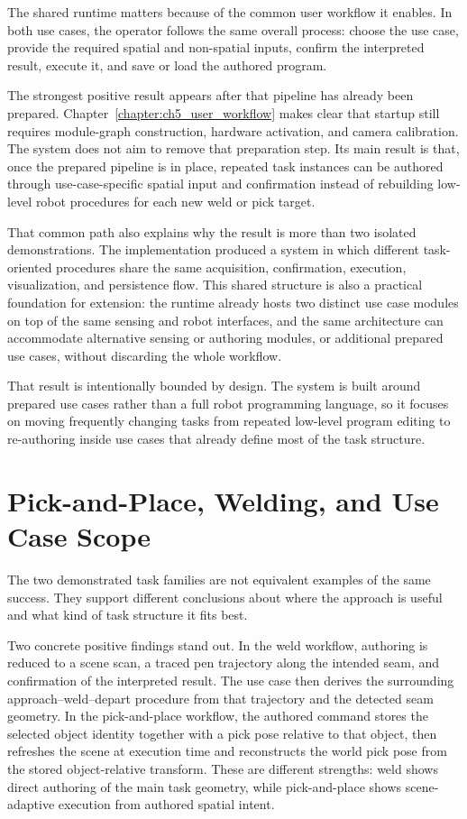The shared runtime matters because of the common user workflow it enables. In both use cases, the operator follows the same overall process: choose the use case, provide the required spatial and non-spatial inputs, confirm the interpreted result, execute it, and save or load the authored program.

The strongest positive result appears after that pipeline has already been prepared. Chapter~\ref{chapter:ch5_user_workflow} makes clear that startup still requires module-graph construction, hardware activation, and camera calibration. The system does not aim to remove that preparation step. Its main result is that, once the prepared pipeline is in place, repeated task instances can be authored through use-case-specific spatial input and confirmation instead of rebuilding low-level robot procedures for each new weld or pick target.

That common path also explains why the result is more than two isolated demonstrations. The implementation produced a system in which different task-oriented procedures share the same acquisition, confirmation, execution, visualization, and persistence flow. This shared structure is also a practical foundation for extension: the runtime already hosts two distinct use case modules on top of the same sensing and robot interfaces, and the same architecture can accommodate alternative sensing or authoring modules, or additional prepared use cases, without discarding the whole workflow.

That result is intentionally bounded by design. The system is built around prepared use cases rather than a full robot programming language, so it focuses on moving frequently changing tasks from repeated low-level program editing to re-authoring inside use cases that already define most of the task structure.

\section{Pick-and-Place, Welding, and Use Case Scope}

The two demonstrated task families are not equivalent examples of the same success. They support different conclusions about where the approach is useful and what kind of task structure it fits best.

Two concrete positive findings stand out. In the weld workflow, authoring is reduced to a scene scan, a traced pen trajectory along the intended seam, and confirmation of the interpreted result. The use case then derives the surrounding approach--weld--depart procedure from that trajectory and the detected seam geometry. In the pick-and-place workflow, the authored command stores the selected object identity together with a pick pose relative to that object, then refreshes the scene at execution time and reconstructs the world pick pose from the stored object-relative transform. These are different strengths: weld shows direct authoring of the main task geometry, while pick-and-place shows scene-adaptive execution from authored spatial intent.

